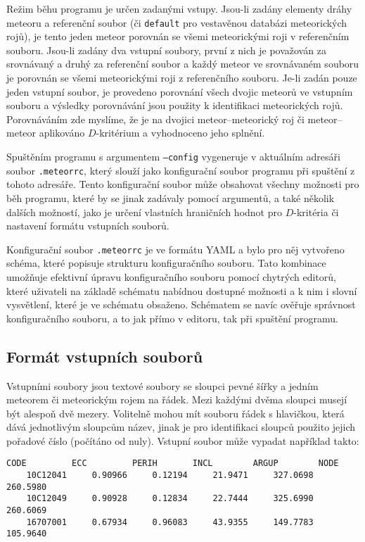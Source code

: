 Režim běhu programu je určen zadanými vstupy. Jsou-li zadány elementy dráhy meteoru a referenční soubor (či \texttt{default} pro vestavěnou databázi meteorických rojů), je tento jeden meteor porovnán se všemi meteorickými roji v referenčním souboru. Jsou-li zadány dva vstupní soubory, první z nich je považován za srovnávaný a druhý za referenční soubor a každý meteor ve srovnávaném souboru je porovnán se všemi meteorickými roji z referenčního souboru. Je-li zadán pouze jeden vstupní soubor, je provedeno porovnání všech dvojic meteorů ve vstupním souboru a výsledky porovnávání jsou použity k identifikaci meteorických rojů. Porovnáváním zde myslíme, že je na dvojici meteor--meteorický roj či meteor--meteor aplikováno $D$-kritérium a vyhodnoceno jeho splnění.

\medskip

Spuštěním programu s argumentem \texttt{---config} vygeneruje v aktuálním adresáři soubor \texttt{.meteorrc}, který slouží jako konfigurační soubor programu při spuštění z tohoto adresáře. Tento konfigurační soubor může obsahovat všechny možnosti pro běh programu, které by se jinak zadávaly pomocí argumentů, a také několik dalších možností, jako je určení vlastních hraničních hodnot pro $D$-kritéria či nastavení formátu vstupních souborů.

Konfigurační soubor \texttt{.meteorrc} je ve formátu YAML a bylo pro něj vytvořeno schéma, které popisuje strukturu konfiguračního souboru. Tato kombinace umožňuje efektivní úpravu konfiguračního souboru pomocí chytrých editorů, které uživateli na základě schématu nabídnou dostupné možnosti a k nim i slovní vysvětlení, které je ve schématu obsaženo. Schématem se navíc ověřuje správnost konfiguračního souboru, a to jak přímo v editoru, tak při spuštění programu.

\subsection{Formát vstupních souborů}%
Vstupními soubory jsou textové soubory se sloupci pevné šířky a jedním meteorem či meteorickým rojem na řádek. Mezi každými dvěma sloupci musejí být alespoň dvě mezery. Volitelně mohou mít souboru řádek s hlavičkou, která dává jednotlivým sloupcům název, jinak je pro identifikaci sloupců použito jejich pořadové číslo (počítáno od nuly). Vstupní soubor může vypadat například takto:
\begin{Verbatim}[commandchars=\\\{\},gobble=4,formatcom=\footnotesize,codes={\catcode`$=3\catcode`^=7},frame=lines,reflabel=code:practical:input,label=DAT]
    CODE         ECC         PERIH       INCL        ARGUP        NODE
    10C12041     0.90966     0.12194     21.9471     327.0698     260.5980
    10C12049     0.90928     0.12834     22.7444     325.6990     260.6069
    16707001     0.67934     0.96083     43.9355     149.7783     105.9640
\end{Verbatim}

